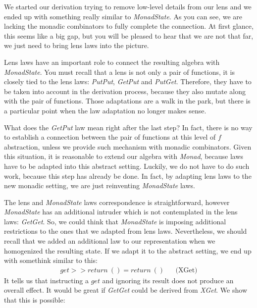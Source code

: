 \documentclass[a4paper]{article}
\begin{document}
We started our derivation trying to remove low-level details from our lens and
we ended up with something really similar to \emph{MonadState}. As you can see,
we are lacking the monadic combinators to fully complete the connection. At
first glance, this seems like a big gap, but you will be pleased to hear that we
are not that far, we just need to bring lens laws into the picture.

Lens laws have an important role to connect the resulting algebra with
\emph{MonadState}. You must recall that a lens is not only a pair of functions,
it is closely tied to the lens laws: \emph{PutPut}, \emph{GetPut} and
\emph{PutGet}. Therefore, they have to be taken into account in the derivation
process, because they also mutate along with the pair of functions. Those
adaptations are a walk in the park, but there is a particular point when the law
adaptation no longer makes sense.

What does the \emph{GetPut} law mean right after the last step? In fact, there
is no way to establish a connection between the pair of functions at this level
of $f$ abstraction, unless we provide such mechanism with monadic combinators.
Given this situation, it is reasonable to extend our algebra with \emph{Monad},
because laws have to be adapted into this abstract setting. Luckily, we do not
have to do such work, because this step has already be done. In fact, by
adapting lens laws to the new monadic setting, we are just reinventing
\emph{MonadState} laws.

The lens and \emph{MonadState} laws correspondence is straightforward, however
\emph{MonadState} has an additional intruder which is not contemplated in the
lens laws: \emph{GetGet}. So, we could think that \emph{MonadState} is imposing
additional restrictions to the ones that we adapted from lens laws.
Nevertheless, we should recall that we added an additional law to our
representation when we homogenized the resulting state. If we adapt it to the
abstract setting, we end up with somethink similar to this:
\begin{align*}
  get >> return\ () = return\ () &&\text{(XGet)}
\end{align*}
It tells us that instructing a $get$ and ignoring its result does not produce an
overall effect. It would be great if \emph{GetGet} could be derived from
\emph{XGet}. We show that this is possible:
\end{document}
